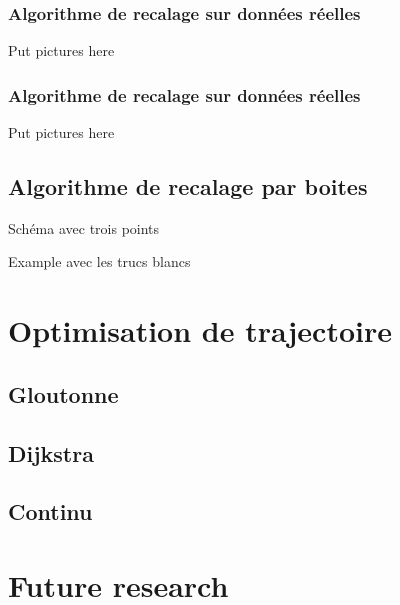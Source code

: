 \documentclass[11pt]{beamer}
\begin{document}

\begin{frame}

\frametitle{Algorithme de recalage sur données réelles}

Put pictures here

\end{frame}





\begin{frame}

\frametitle{Algorithme de recalage sur données réelles}

Put pictures here

\end{frame}

\subsection{Algorithme de recalage par boites}
Schéma avec trois points

Example avec les trucs blancs
\section{Optimisation de trajectoire}
\subsection{Gloutonne}
\subsection{Dijkstra}
\subsection{Continu}
\section{Future research}
\end{document}
